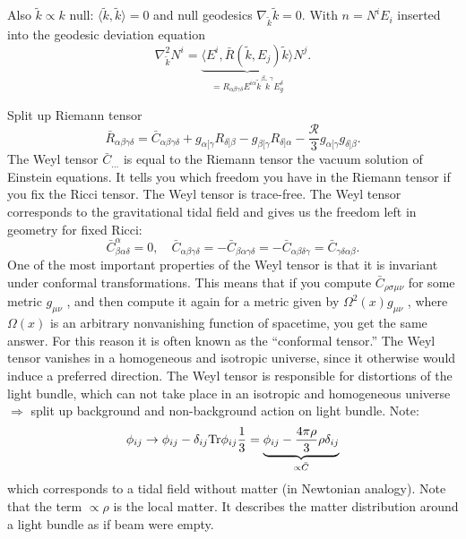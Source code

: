 Also $\tilde{k} \propto k $ null: $\langle \tilde{k},\tilde{k} \rangle =0$ and null geodesics $\nabla_{\tilde{k}} \tilde{k} =0$. With $n = N^i E_i$ inserted into the geodesic deviation equation
\begin{equation}
\nabla^2_{\tilde{k}} N^i =\underbrace{ \langle E^i, \bar{R}(\tilde{k},E_j) \tilde{k} \rangle}_{=R_{\alpha \beta \gamma \delta} E^{i \alpha} \tilde{k}^{\beta} \tilde{k}^{\gamma} E^{\delta}_g} N^j .
\end{equation}
\begin{mybox}{Split up Riemann tensor }
	\begin{equation}
	\bar{R}_{\alpha \beta \gamma \delta} = \bar{C}_{\alpha \beta \gamma \delta} + g_{\alpha [\gamma} R_{\delta ] \beta} - g_{\beta [\gamma} R_{\delta] \alpha} - \frac{\mathcal{R}}{3} g_{\alpha [\gamma} g_{\delta] \beta}.
	\end{equation}
	The Weyl tensor $\bar{C}_{\dots}$ is equal to the Riemann tensor the vacuum solution of Einstein equations. It tells you which freedom you have in the Riemann tensor if you fix the Ricci tensor. The Weyl tensor is trace-free. The Weyl tensor corresponds to the gravitational tidal field and gives us the freedom left in geometry for fixed Ricci:
	\begin{equation}
	\bar{C}^{\alpha}_{\beta \alpha \delta} = 0, \quad \bar{C}_{\alpha \beta \gamma \delta} = - \bar{C}_{\beta \alpha \gamma \delta} = - \bar{C}_{\alpha \beta \delta \gamma}= \bar{C}_{\gamma\delta \alpha \beta}.
	\end{equation}
	One of the most important properties of the Weyl tensor is that it is invariant under conformal transformations. This means that if you compute $\bar{C}_{ρσμν}$ for some metric $g_{μν}$ , and then
	compute it again for a metric given by $Ω^2 (x) g_{μν}$ , where $Ω(x)$ is an arbitrary nonvanishing
	function of spacetime, you get the same answer. For this reason it is often known as the
	“conformal tensor.”
	The Weyl tensor vanishes in a homogeneous and isotropic universe, since it otherwise would induce a preferred direction. The Weyl tensor is responsible for distortions of the light bundle, which can not take place in an isotropic and homogeneous universe $\Rightarrow$ split up background and non-background action on light bundle.
	Note:
	\begin{equation}
	\phi_{ij} \rightarrow \phi_{ij} - \delta_{ij}\mathrm{Tr} \phi_{ij} \frac{1}{3} = \underbrace{\phi_{ij}- \frac{4 \pi \rho}{3} \rho \delta_{ij}}_{\propto \bar{C}}
	\end{equation}
	which corresponds to a tidal field without matter (in Newtonian analogy). Note that the term $\propto \rho$ is the local matter. It describes the matter distribution around a light bundle as if beam were empty.
\end{mybox}
